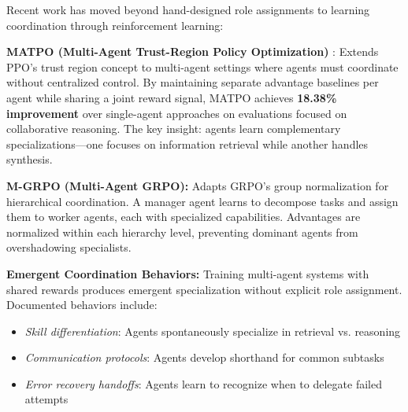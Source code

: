 \documentclass[12pt,a4paper]{report}
\theoremstyle{definition}
\begin{document}
Recent work has moved beyond hand-designed role assignments to learning coordination through reinforcement learning:

\textbf{MATPO (Multi-Agent Trust-Region Policy Optimization)} \cite{mo2025matpo}: Extends PPO's trust region concept to multi-agent settings where agents must coordinate without centralized control. By maintaining separate advantage baselines per agent while sharing a joint reward signal, MATPO achieves \textbf{18.38\% improvement} over single-agent approaches on evaluations focused on collaborative reasoning.
 The key insight: agents learn complementary specializations---one focuses on information retrieval while another handles synthesis.

\textbf{M-GRPO (Multi-Agent GRPO):} Adapts GRPO's group normalization for hierarchical coordination. A manager agent learns to decompose tasks and assign them to worker agents, each with specialized capabilities. Advantages are normalized within each hierarchy level, preventing dominant agents from overshadowing specialists.

\textbf{Emergent Coordination Behaviors:} Training multi-agent systems with shared rewards produces emergent specialization without explicit role assignment. Documented behaviors include:
\begin{itemize}
    \item \textit{Skill differentiation}: Agents spontaneously specialize in retrieval vs. reasoning
    \item \textit{Communication protocols}: Agents develop shorthand for common subtasks
    \item \textit{Error recovery handoffs}: Agents learn to recognize when to delegate failed attempts
\end{itemize}
\end{document}
